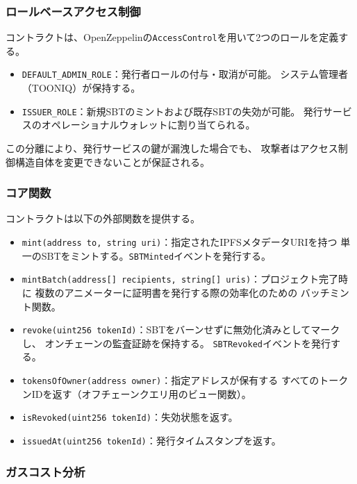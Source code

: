 \subsubsection{ロールベースアクセス制御}

コントラクトは、OpenZeppelinの\texttt{AccessControl}を用いて2つのロールを定義する。

\begin{itemize}
  \item \texttt{DEFAULT\_ADMIN\_ROLE}：発行者ロールの付与・取消が可能。
    システム管理者（TOONIQ）が保持する。
  \item \texttt{ISSUER\_ROLE}：新規SBTのミントおよび既存SBTの失効が可能。
    発行サービスのオペレーショナルウォレットに割り当てられる。
\end{itemize}

この分離により、発行サービスの鍵が漏洩した場合でも、
攻撃者はアクセス制御構造自体を変更できないことが保証される。

\subsubsection{コア関数}

コントラクトは以下の外部関数を提供する。

\begin{itemize}
  \item \texttt{mint(address to, string uri)}：指定されたIPFSメタデータURIを持つ
    単一のSBTをミントする。\texttt{SBTMinted}イベントを発行する。
  \item \texttt{mintBatch(address[] recipients, string[] uris)}：プロジェクト完了時に
    複数のアニメーターに証明書を発行する際の効率化のための
    バッチミント関数。
  \item \texttt{revoke(uint256 tokenId)}：SBTをバーンせずに無効化済みとしてマークし、
    オンチェーンの監査証跡を保持する。
    \texttt{SBTRevoked}イベントを発行する。
  \item \texttt{tokensOfOwner(address owner)}：指定アドレスが保有する
    すべてのトークンIDを返す（オフチェーンクエリ用のビュー関数）。
  \item \texttt{isRevoked(uint256 tokenId)}：失効状態を返す。
  \item \texttt{issuedAt(uint256 tokenId)}：発行タイムスタンプを返す。
\end{itemize}

\subsubsection{ガスコスト分析}

